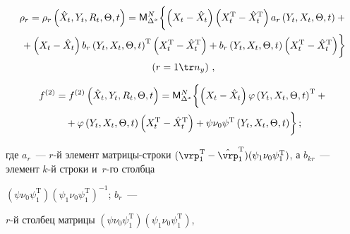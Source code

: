 \begin{multline}

\rho_r=\rho_r\left(\hat X_t,Y_t, R_t,\Theta, t\right)={\sf M}_{\Delta^x}^N

    \biggl\{  \left(X_t-\hat X_t\right)

    \left(X_t^{\mathrm{T}}-\hat X_t^{\mathrm{T}}\right) 

    a_r \left(Y_t,X_t,\Theta, t\right)+{}\\

{}+ \left(X_t-\hat X_t\right) b_r\left(Y_t,X_t,\Theta, t\right)^{\mathrm{T}} 

\left(X_t^{\mathrm{T}}-\hat X_t^{\mathrm{T}}\right)+ b_r \left(Y_t,X_t,\Theta, t\right) 

\left(X_t^{\mathrm{T}}-\hat     X_t^{\mathrm{T}}\right)\biggr\}\\

\left(r=1\tr n_y\right)\,,

\label{e3.3-s1}

\end{multline}



\vspace*{-16pt}



\noindent

\begin{multline}

f^{(2)}=f^{(2)}\left(\hat X_t, Y_t,R_t,\Theta, t\right)={\sf M}_{\Delta^x}^N

    \biggl\{  \left(X_t-\hat X_t\right)\varphi\left(Y_t,X_t,\Theta, t\right)^{\mathrm{T}} + {}\\

{}+ \varphi \left(Y_t,X_t,\Theta, t\right) \left(X_t^{\mathrm{T}}-\hat X_t^{\mathrm{T}}\right) +

\psi\nu_0\psi^{\mathrm{T}} \left(Y_t,X_t,\Theta, t\right)\biggr\}\,;

\label{e24a}

\end{multline}

где $a_r$~--- $r$-й элемент матрицы-строки $(\vrp_1^{\mathrm{T}} -\hat\vrp_1^{\mathrm{T}}) 

(\psi_1\nu_0\psi_1^{\mathrm{T}})$, а $b_{kr}$~--- элемент $k$-й строки и~$r$-го столбца 

$(\psi\nu_0\psi_1^{\mathrm{T}})(\psi_1\nu_0\psi_1^{\mathrm{T}})^{-1}$; $b_r$~--- 

$r$-й столбец матрицы $(\psi\nu_0\psi_1^{\mathrm{T}})(\psi_1\nu_0\psi_1^{\mathrm{T}})$, 


